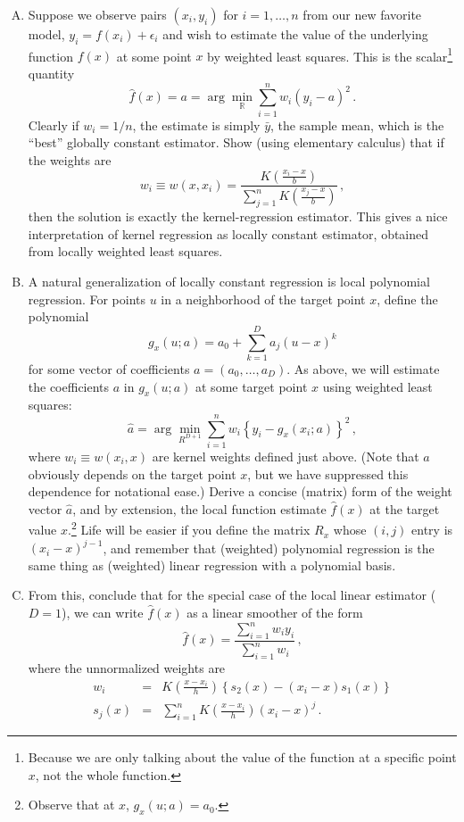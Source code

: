 \documentclass{mynotes}
\begin{document}
\begin{enumerate}[(A)]

\item Suppose we observe pairs $(x_i, y_i)$ for $i = 1, \ldots, n$ from our new favorite model, $y_i = f(x_i) + \epsilon_i$ and wish to estimate the value of the underlying function $f(x)$ at some point $x$ by weighted least squares.  This is the scalar\footnote{Because we are only talking about the value of the function at a specific point $x$, not the whole function.} quantity
$$
\hat{f}(x) = a = \arg \min_{\mathbb{R}} \sum_{i=1}^n w_i (y_i - a)^2 \, .
$$
Clearly if $w_i = 1/n$, the estimate is simply $\bar{y}$, the sample mean, which is the ``best'' globally constant estimator.  Show (using elementary calculus) that if the weights are
$$
w_i \equiv w(x, x_i) = \frac{ K \left( \frac{x_i - x}{b} \right) }{\sum_{j=1}^n  K \left( \frac{x_j - x}{b} \right)  } \, ,
$$
then the solution is exactly the kernel-regression estimator.  This gives a nice interpretation of kernel regression as locally constant estimator, obtained from locally weighted least squares.

\item  A natural generalization of locally constant regression is local polynomial regression.  For points $u$ in a neighborhood of the target point $x$, define the polynomial
$$
g_{x}(u; a) = a_0 + \sum_{k=1}^D a_j(u-x)^k 
$$
for some vector of coefficients $a = (a_0, \ldots, a_D)$.  As above, we will estimate the coefficients $a$ in $g_{x}(u; a)$ at some target point $x$ using weighted least squares:
$$
\hat{a} = \arg \min_{R^{D+1}} \sum_{i=1}^n w_i \left\{ y_i - g_{x}(x_i; a)  \right\}^2 \, ,
$$
where $w_i \equiv w(x_i, x)$ are kernel weights defined just above.  (Note that $\hat{a}$ obviously depends on the target point $x$, but we have suppressed this dependence for notational ease.) Derive a concise (matrix) form of the weight vector $\hat{a}$, and by extension, the local function estimate $\hat{f}(x)$ at the target value $x$.\footnote{Observe that at $x$, $g_x(u; a) = a_0$.}   Life will be easier if you define the matrix $R_x$ whose $(i,j)$ entry is $(x_i-x)^{j-1}$, and remember that (weighted) polynomial regression is the same thing as (weighted) linear regression with a polynomial basis.

\item From this, conclude that for the special case of the local linear estimator ($D=1$), we can write $\hat{f}(x)$ as a linear smoother of the form
$$
\hat{f}(x) = \frac{\sum_{i=1}^n w_i y_i }{\sum_{i=1}^n w_i} \, ,
$$
where the unnormalized weights are
\begin{eqnarray*}
w_i &=& K \left( \frac{x-x_i}{h} \right) \left\{  s_2(x) - (x_i-x) s_1(x) \right\}\\
s_j(x) &=& \sum_{i=1}^n K \left( \frac{x-x_i}{h} \right) (x_i-x)^j \, .
\end{eqnarray*}


\end{enumerate}
\end{document}
